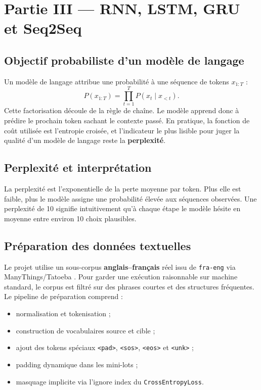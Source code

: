 \chapter{Partie III --- RNN, LSTM, GRU et Seq2Seq}

\section{Objectif probabiliste d’un modèle de langage}
Un modèle de langage attribue une probabilité à une séquence de tokens $x_{1:T}$ :
\[
P(x_{1:T}) = \prod_{t=1}^{T} P(x_t \mid x_{<t}).
\]
Cette factorisation découle de la règle de chaîne. Le modèle apprend donc à prédire le prochain token sachant le contexte passé. En pratique, la fonction de coût utilisée est l’entropie croisée, et l’indicateur le plus lisible pour juger la qualité d’un modèle de langage reste la \textbf{perplexité}.

\section{Perplexité et interprétation}
La perplexité est l’exponentielle de la perte moyenne par token. Plus elle est faible, plus le modèle assigne une probabilité élevée aux séquences observées. Une perplexité de 10 signifie intuitivement qu’à chaque étape le modèle hésite en moyenne entre environ 10 choix plausibles.

\section{Préparation des données textuelles}
Le projet utilise un sous-corpus \textbf{anglais--français} réel issu de \texttt{fra-eng} via ManyThings/Tatoeba \citep{manythings2026}. Pour garder une exécution raisonnable sur machine standard, le corpus est filtré sur des phrases courtes et des structures fréquentes. Le pipeline de préparation comprend :
\begin{itemize}[leftmargin=1.2cm]
    \item normalisation et tokenisation ;
    \item construction de vocabulaires source et cible ;
    \item ajout des tokens spéciaux \texttt{<pad>}, \texttt{<sos>}, \texttt{<eos>} et \texttt{<unk>} ;
    \item padding dynamique dans les mini-lots ;
    \item masquage implicite via l’ignore index du \texttt{CrossEntropyLoss}.
\end{itemize}

